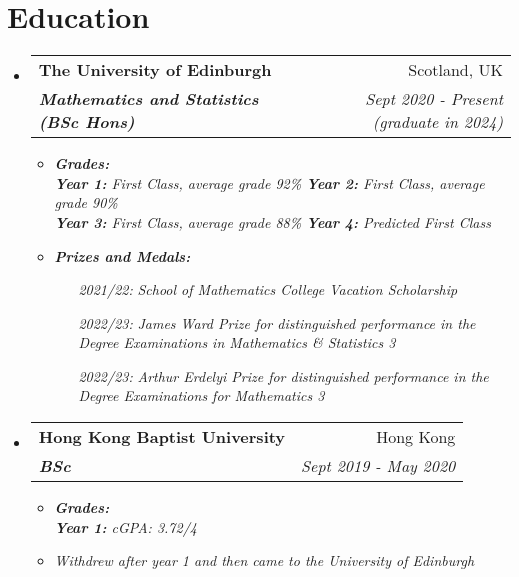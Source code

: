 \documentclass[12pt, a4paper]{article}
\makeatletter
\newcommand{\resumeSection}[1]{
    \section*{#1}
}
\newcommand{\resumeSectionItm}[4]{
\item
    \begin{tabular*}{0.96\textwidth}{@{}l@{\extracolsep{\fill}}r@{}}
        \textbf{#1} & #2 \\
        \textit{\textbf{#3}} & \textit{#4}
    \end{tabular*}
}
\makeatother
\begin{document}
\resumeSection{Education}
\begin{itemize}[leftmargin=*]
    \resumeSectionItm
    {The University of Edinburgh}{Scotland, UK}
    {Mathematics and Statistics (BSc Hons)}{Sept 2020 - Present
    (graduate in 2024)}
    \begin{itemize}[leftmargin=*]
        \item \it{\textbf{Grades:}}\\
            \it{\footnotesize\textbf{Year 1:} First Class, average grade 92\%}
            \hspace{5mm}\it{\footnotesize\textbf{Year 2:} First Class, average grade 90\%}\\
            \it{\footnotesize\textbf{Year 3:} First Class, average grade 88\%}
            \hspace{5mm}\it{\footnotesize\textbf{Year 4:} Predicted First Class}
        \item \it{\textbf{Prizes and Medals:}}
            \begin{itemize}[
                align=left,
                leftmargin=4em,
                itemindent=0.5pt,
                labelsep=0pt,
                labelwidth=4em
                ]
                \item [\it{2021/22:}]
                    \it{School of Mathematics College Vacation Scholarship}
                \item [\it{2022/23:}]
                    \it{James Ward Prize for distinguished performance in the
                        Degree Examinations in Mathematics \& Statistics 3}
                \item [\it{2022/23:}]
                    \it{Arthur Erdelyi Prize for distinguished
                    performance in the Degree Examinations for Mathematics 3}
            \end{itemize}
    \end{itemize}
\end{itemize}
\vspace{-5mm}
\begin{itemize}[leftmargin=*]
    \resumeSectionItm
    {Hong Kong Baptist University}{Hong Kong}
    {BSc}{Sept 2019 - May 2020}
    \vspace{-1.5mm}
    \begin{itemize}[leftmargin=*]
        \item \it{\textbf{Grades:}}\\
            \textit{\footnotesize\textbf{Year 1:} cGPA: 3.72/4}
        \item \textit{\footnotesize Withdrew after year 1 and then came to the
            University of Edinburgh}
    \end{itemize}
\end{itemize}
\vspace{-4mm}
\end{document}
